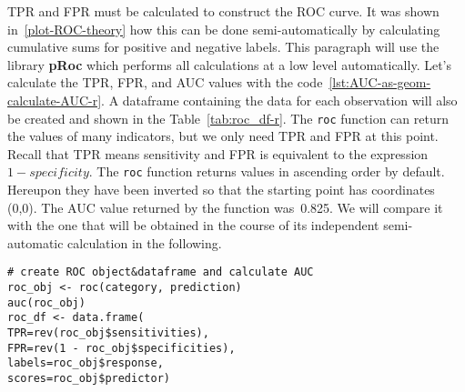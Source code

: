 \documentclass[]{scrreprt}
\begin{document}
TPR and FPR must be calculated to construct the ROC curve. It was shown in~\ref{plot-ROC-theory} how this can be done semi-automatically by calculating cumulative sums for positive and negative labels. This paragraph will use the library \textbf{pRoc} which performs all calculations at a low level automatically. Let's calculate the TPR, FPR, and AUC values with the code~\ref{lst:AUC-as-geom-calculate-AUC-r}. A dataframe containing the data for each observation will also be created and shown in the Table~\ref{tab:roc_df-r}. The \texttt{roc} function can return the values of many indicators, but we only need TPR and FPR at this point. Recall that TPR means sensitivity and FPR is equivalent to the expression $1 - specificity$. The \texttt{roc} function returns values in ascending order by default. Hereupon they have been inverted so that the starting point has coordinates (0,0). The AUC value returned by the function was~0.825. We will compare it with the one that will be obtained in the course of its independent semi-automatic calculation in the following.
%
\begin{lstlisting}[float=htp, caption = Calculation of~the AUC using the pRoc library, firstnumber=1, label= lst:AUC-as-geom-calculate-AUC-r]
# create ROC object&dataframe and calculate AUC
roc_obj <- roc(category, prediction)
auc(roc_obj)
roc_df <- data.frame(
TPR=rev(roc_obj$sensitivities), 
FPR=rev(1 - roc_obj$specificities), 
labels=roc_obj$response, 
scores=roc_obj$predictor)
\end{lstlisting}
%
\end{document}
